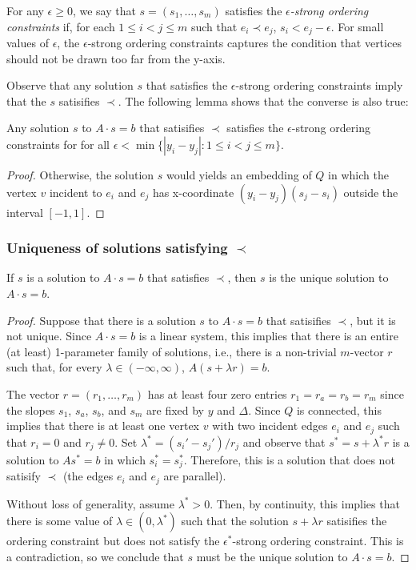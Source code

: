 \documentclass{patmorin}
\begin{document}
For any $\epsilon \ge 0$, we say that $s=(s_1,\ldots,s_m)$ satisfies the
\emph{$\epsilon$-strong ordering constraints} if, for each $1\le i<j\le
m$ such that $e_i\prec e_j$, $s_i < e_j - \epsilon$.  For small values
of $\epsilon$, the $\epsilon$-strong ordering constraints captures the
condition that vertices should not be drawn too far from the y-axis.

Observe that any solution $s$ that satisfies the $\epsilon$-strong
ordering constraints imply that the $s$ satisifies $\prec$. The following
lemma shows that the converse is also true:

\begin{lem}
   Any solution $s$ to $A\cdot s=b$ that satisifies $\prec$ satisfies the
   $\epsilon$-strong ordering constraints for
   for all $\epsilon<\min\{|y_i-y_j| : 1\le i< j\le m\}$.
\end{lem}

\begin{proof}
   Otherwise, the solution $s$ would yields an embedding of $Q$ in
   which the vertex $v$ incident to $e_i$ and $e_j$ has x-coordinate
   $(y_i-y_j)(s_j-s_i)$ outside the interval $[-1,1]$.
\end{proof}

\subsubsection{Uniqueness of solutions satisfying $\prec$}

\begin{lem}
   If $s$ is a solution to $A\cdot s=b$ that satisfies $\prec$, then $s$ is 
   the unique solution to $A\cdot s=b$.
\end{lem}

\begin{proof}
   Suppose that there is a solution $s$ to $A\cdot s=b$ that satisifies $\prec$,
   but it is not unique.  Since $A\cdot s=b$ is a linear system, this implies
   that there is an entire (at least) 1-parameter family of solutions,
   i.e., there is a non-trivial $m$-vector $r$ such that, for every
   $\lambda\in(-\infty,\infty)$, $A(s+\lambda r)=b$.

   The vector $r=(r_1,\ldots,r_m)$ has at least four zero entries
   $r_1=r_a=r_b=r_m$ since the slopes $s_1$, $s_a$, $s_b$, and $s_m$
   are fixed by $y$ and $\Delta$.  Since $Q$ is connected, this implies
   that there is at least one vertex $v$ with two incident edges $e_i$
   and $e_j$ such that $r_i=0$ and $r_j\neq 0$.  Set $\lambda^* =
   (s_i'-s_j')/r_j$ and observe that $s^*=s+\lambda^* r$ is a solution
   to $As^*=b$ in which $s_i^*=s_j^*$.  Therefore, this is a solution that
   does not satisify $\prec$ (the edges $e_i$ and $e_j$
   are parallel).  

   Without loss of generality, assume $\lambda^* >0$. Then, by continuity,
   this implies that there is some value of $\lambda\in (0,\lambda^*)$
   such that the solution $s+\lambda r$ satisifies the ordering constraint
   but does not satisfy the $\epsilon^*$-strong ordering constraint.
   This is a contradiction, so we conclude that $s$ must be the unique
   solution to $A\cdot s=b$.
\end{proof}
\end{document}

